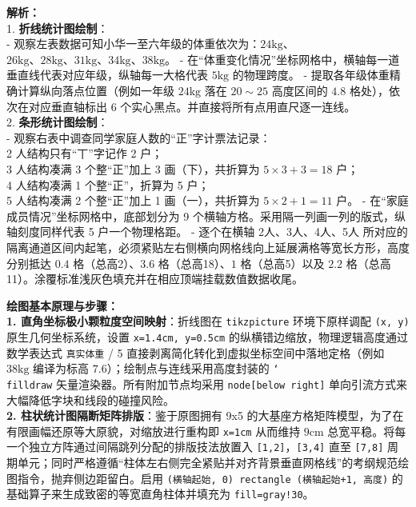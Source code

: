 {\small\color{gray}
\textbf{解析：}\\
1. \textbf{折线统计图绘制}：\\
- 观察左表数据可知小华一至六年级的体重依次为：$24\text{kg}$、$26\text{kg}、28\text{kg}、31\text{kg}、34\text{kg}、38\text{kg}$。
- 在“体重变化情况”坐标网格中，横轴每一道垂直线代表对应年级，纵轴每一大格代表 $5\text{kg}$ 的物理跨度。
- 提取各年级体重精确计算纵向落点位置（例如一年级 $24\text{kg}$ 落在 $20 \sim 25$ 高度区间的 $4.8$ 格处），依次在对应垂直轴标出 6 个实心黑点。并直接将所有点用直尺逐一连线。\\
2. \textbf{条形统计图绘制}：\\
- 观察右表中调查同学家庭人数的“正”字计票法记录：\\
  2 人结构只有“丅”字记作 2 户；\\
  3 人结构凑满 3 个整“正”加上 3 画（下），共折算为 $5\times3+3=18$ 户；\\
  4 人结构凑满 1 个整“正”，折算为 5 户；\\
  5 人结构凑满 2 个整“正”加上 1 画（一），共折算为 $5\times2+1=11$ 户。
- 在“家庭成员情况”坐标网格中，底部划分为 9 个横轴方格。采用隔一列画一列的版式，纵轴刻度同样代表 5 户一个物理格距。
- 逐个在横轴 2人$、$3人、4人、5人 所对应的隔离通道区间内起笔，必须紧贴左右侧横向网格线向上延展满格等宽长方形，高度分别抵达 $0.4$ 格（总高2）、$3.6$ 格（总高18）、$1$ 格（总高5）以及 $2.2$ 格（总高11）。涂覆标准浅灰色填充并在相应顶端挂载数值数据收尾。
}

\vspace{0.6cm}

{\small\color{blue!70!black}
\textbf{绘图基本原理与步骤：}\\
\textbf{1. 直角坐标极小颗粒度空间映射}：折线图在 \texttt{tikzpicture} 环境下原样调配 \texttt{(x, y)} 原生几何坐标系统，设置 \texttt{x=1.4cm, y=0.5cm} 的纵横错边缩放，物理逻辑高度通过数学表达式 \texttt{真实体重} / 5 直接剥离简化转化到虚拟坐标空间中落地定格（例如 $38\text{kg}$ 编译为标高 $7.6$）；绘制点与连线采用高度封装的 \texttt{\char`\\filldraw} 矢量渲染器。所有附加节点均采用 \texttt{node[below right]} 单向引流方式来大幅降低字块和线段的碰撞风险。\\
\textbf{2. 柱状统计图隔断矩阵排版}：鉴于原图拥有 9x5 的大基座方格矩阵模型，为了在有限画幅还原等大原貌，对缩放进行重构即 \texttt{x=1cm} 从而维持 $9\text{cm}$ 总宽平稳。将每一个独立方阵通过间隔跳列分配的排版技法放置入 \texttt{[1,2]}，\texttt{[3,4]} 直至 \texttt{[7,8]} 周期单元；同时严格遵循“柱体左右侧完全紧贴并对齐背景垂直网格线”的考纲规范绘图指令，抛弃侧边距留白。启用 \texttt{(横轴起始, 0) rectangle (横轴起始+1, 高度)} 的基础算子来生成致密的等宽直角柱体并填充为 \texttt{fill=gray!30}。
}

